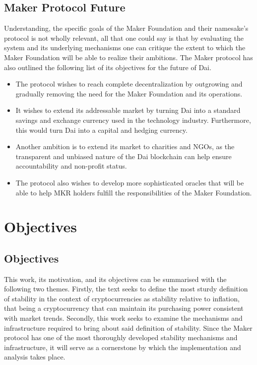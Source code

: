 \documentclass[bsc,frontabs,singlespacing,parskip,deptreport]{infthesis}
\begin{document}
    \subsection{Maker Protocol Future} 
    Understanding, the specific goals of the Maker Foundation and their namesake's protocol is not wholly relevant, all that one could say is that by evaluating the system and its underlying mechanisms one can critique the extent to which the Maker Foundation will be able to realize their ambitions. The Maker protocol has also outlined the following list of its objectives for the future of Dai.
    \begin{itemize}
        \item The protocol wishes to reach complete decentralization by outgrowing and gradually removing the need for the Maker Foundation and its operations. 
        \item It wishes to extend its addressable market by turning Dai into a standard savings and exchange currency used in the technology industry. Furthermore, this would turn Dai into a capital and hedging currency.
        \item Another ambition is to extend its market to charities and NGOs, as the transparent and unbiased nature of the Dai blockchain can help ensure accountability and non-profit status.
        \item The protocol also wishes to develop more sophisticated oracles that will be able to help MKR holders fulfill the responsibilities of the Maker Foundation.
    \end{itemize}
    
    \section{Objectives}
    \subsection{Objectives}
    \smallbreak \noindent 
    This work, its motivation, and its objectives can be summarised with the following two themes. Firstly, the text seeks to define the most sturdy definition of stability in the context of cryptocurrencies as stability relative to inflation, that being a cryptocurrency that can maintain its purchasing power consistent with market trends. Secondly, this work seeks to examine the mechanisms and infrastructure required to bring about said definition of stability. Since the Maker protocol has one of the most thoroughly developed stability mechanisms and infrastructure, it will serve as a cornerstone by which the implementation and analysis takes place. 
\end{document}
